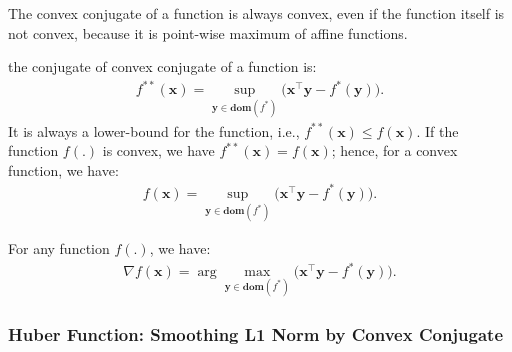 \documentclass[lang=cn,10pt]{gorgeousnbook}
\numberwithin{equation}{section}%
\numberwithin{figure}{section}%
\begin{document}
The convex conjugate of a function is always convex, even if the function itself is not convex, because it is point-wise maximum of affine functions. 

\begin{lemma}
the conjugate of convex conjugate of a function is:
\begin{align}
f^{**}(\boldsymbol{x}) = \sup_{\boldsymbol{y} \in \textbf{dom}(f^*)} \big( \boldsymbol{x}^\top \boldsymbol{y} - f^*(\boldsymbol{y}) \big). 
\end{align}
It is always a lower-bound for the function, i.e., $f^{**}(\boldsymbol{x}) \leq f(\boldsymbol{x})$. If the function $f(.)$ is convex, we have $f^{**}(\boldsymbol{x}) = f(\boldsymbol{x})$; hence, for a convex function, we have:
\begin{align}\label{equation_f_equals_conjigate_of_convex_conjugate}
f(\boldsymbol{x}) = \sup_{\boldsymbol{y} \in \textbf{dom}(f^*)} \big( \boldsymbol{x}^\top \boldsymbol{y} - f^*(\boldsymbol{y}) \big). 
\end{align}
\end{lemma}

\begin{lemma}
For any function $f(.)$, we have:
\begin{align}\label{equation_gradient_intermsof_convex_conjugate}
\nabla f(\boldsymbol{x}) = \arg\max_{\boldsymbol{y} \in \textbf{dom}(f^*)} \big( \boldsymbol{x}^\top \boldsymbol{y} - f^*(\boldsymbol{y}) \big).
\end{align}
\end{lemma}


\subsubsection{Huber Function: Smoothing L1 Norm by Convex Conjugate}



\end{document}

